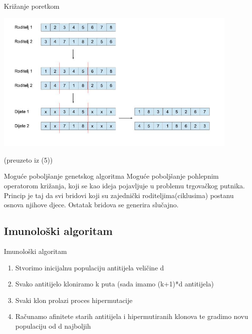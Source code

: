 \documentclass{beamer}
\begin{document}
\begin{frame}{Kri\v{z}anje poretkom}

\includegraphics[width = 12cm, height = 7cm]{krizanje_poretkom.jpg} \\
\begin{center} \tiny (preuzeto iz (5)) \end{center}


\end{frame}


\begin{frame}{Mogu\'{c}e pobolj\v{s}anje genetskog algoritma}
Mogu\'{c}e pobolj\v{s}anje pohlepnim operatorom kri\v{z}anja, koji se kao ideja pojavljuje u problemu trgova\v{c}kog putnika. \\
Princip je taj da svi bridovi koji su zajedni\v{c}ki roditeljima(ciklusima)  postanu osnova njihove djece. Ostatak bridova se generira slu\v{c}ajno.
\end{frame}

\subsection{Imunološki algoritam}
\begin{frame}{Imunološki algoritam}

\begin{enumerate}
\item Stvorimo inicijalnu populaciju antitijela veličine d
\item Svako antitijelo kloniramo k puta (sada imamo (k+1)*d antitijela)
\item Svaki klon prolazi proces hipermutacije
\item Računamo afinitete starih antitijela i hipermutiranih klonova te gradimo novu populaciju od d najboljih

\end{enumerate}

\end{frame}
\end{document}
